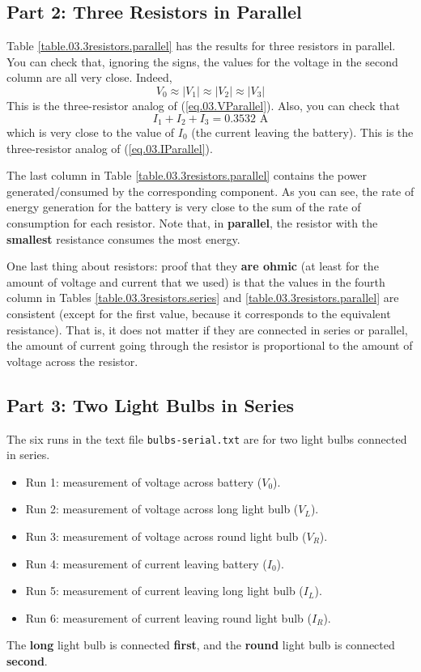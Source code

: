 \subsection{Part 2: Three Resistors in Parallel}
%
Table \ref{table.03.3resistors.parallel} has the results for three resistors in parallel. You can check that, ignoring the signs, the values for the voltage in the second column are all very close. Indeed,
\begin{equation}
	V_{0} \approx |V_{1}| \approx |V_{2}| \approx |V_{3}|
\end{equation}
This is the three-resistor analog of (\ref{eq.03.VParallel}). Also, you can check that
\begin{equation}
	I_{1} + I_{2} + I_{3}  = 0.3532 \text{ A}
\end{equation}
which is very close to the value of $I_{0}$ (the current leaving the battery). This is the three-resistor analog of (\ref{eq.03.IParallel}).

The last column in Table \ref{table.03.3resistors.parallel} contains the power generated/consumed by the corresponding component. As you can see, the rate of energy generation for the battery is very close to the sum of the rate of consumption for each resistor. Note that, in \textbf{parallel}, the resistor with the \textbf{smallest} resistance consumes the most energy.

One last thing about resistors: proof that they \textbf{are ohmic} (at least for the amount of voltage and current that we used) is that the values in the fourth column in Tables \ref{table.03.3resistors.series} and \ref{table.03.3resistors.parallel} are consistent (except for the first value, because it corresponds to the equivalent resistance). That is, it does not matter if they are connected in series or parallel, the amount of current going through the resistor is proportional to the amount of voltage across the resistor.
%
\subsection{Part 3: Two Light Bulbs in Series}
%
The six runs in the text file \texttt{bulbs-serial.txt} are for two light bulbs connected in series.
\begin{itemize}
	\item Run 1: measurement of voltage across battery ($V_{0}$).
	\item Run 2: measurement of voltage across long light bulb ($V_{L}$).
	\item Run 3: measurement of voltage across round light bulb ($V_{R}$).
	\item Run 4: measurement of current leaving battery ($I_{0}$).
	\item Run 5: measurement of current leaving long light bulb ($I_{L}$).
	\item Run 6: measurement of current leaving round light bulb ($I_{R}$).
\end{itemize}
The \textbf{long} light bulb is connected \textbf{first}, and the \textbf{round} light bulb is connected \textbf{second}.
%
